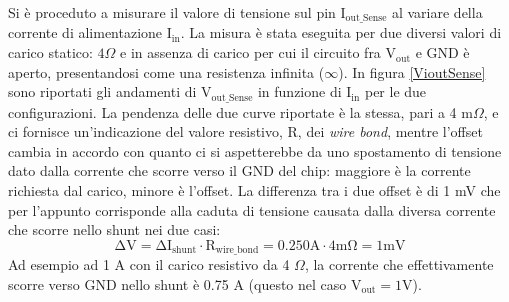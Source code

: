 Si è proceduto a misurare il valore di tensione sul pin $\mathrm{I_{out{\_}Sense}}$ al variare della corrente di alimentazione $\mathrm{I_{in}}$. 
La misura è stata eseguita per due diversi valori di carico statico: $4 \Omega$ e in assenza di carico per cui il circuito fra $\mathrm{V_{out}}$ e GND è aperto, presentandosi come una resistenza infinita ($\infty$).
In figura \ref{VioutSense} sono riportati gli andamenti di $\mathrm{V_{out{\_}Sense}}$ in funzione di $\mathrm{I_{in}}$ per le due configurazioni.
La pendenza delle due curve riportate è la stessa, pari a 4 m$\Omega$, e ci fornisce un'indicazione del valore resistivo, R, dei \textit{wire bond}, mentre l'offset cambia in accordo con quanto ci si aspetterebbe da uno spostamento di tensione dato dalla corrente che scorre verso il GND del chip: maggiore è la corrente richiesta dal carico, minore è l'offset. 
La differenza tra i due offset è di 1 mV che per l'appunto corrisponde alla caduta di tensione causata dalla diversa corrente che scorre nello shunt nei due casi:
\begin{equation}
\mathrm{\Delta V = \Delta I_{shunt} \cdot R_{wire \_ bond} = 0.250 A \cdot 4 m\Omega = 1 mV}
\end{equation}
Ad esempio ad 1 A con il carico resistivo da 4 $\Omega$, la corrente che effettivamente scorre verso GND nello shunt è 0.75 A (questo nel caso $\mathrm{V_{out} = 1 V}$).

%

